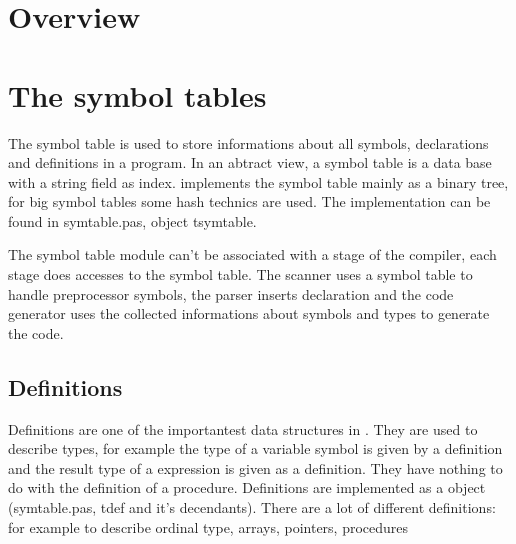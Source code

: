 \documentclass{report}
\begin{document}
\chapter{Overview}


\chapter{The symbol tables}

The symbol table is used to store informations about all
symbols, declarations and definitions in a program.
In an abtract view, a symbol table is a data base with a string field
as index. \fpc implements the symbol table mainly as a binary tree,
for big symbol tables some hash technics are used. The implementation
can be found in symtable.pas, object tsymtable.

The symbol table module can't be associated with a stage of the compiler,
each stage does accesses to the symbol table. 
The scanner uses a symbol table to handle preprocessor symbols, the
parser inserts declaration and the code generator uses the collected
informations about symbols and types to generate the code.

\section{Definitions}

Definitions are one of the importantest data structures in \fpc.
They are used to describe types, for example the type of a variable
symbol is given by a definition and the result type
of a expression is given as a definition. 
They have nothing to do with the definition of a procedure.
Definitions are implemented as a object (symtable.pas, tdef and
it's decendants). There are a lot of different
definitions: for example to describe
ordinal type, arrays, pointers, procedures
\end{document}
